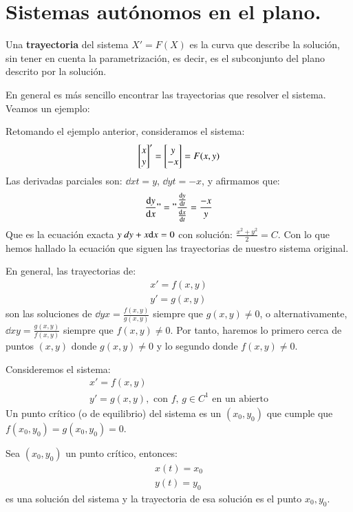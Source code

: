 \section{Sistemas aut\'onomos en el plano.}
\begin{dfn}
    Una \textbf{trayectoria} del sistema $X' = F(X)$ es la curva que describe la solución, sin tener en cuenta la parametrización, es decir, es el subconjunto del plano descrito por la solución.
\end{dfn}
En general es más sencillo encontrar las trayectorias que resolver el sistema. Veamos un ejemplo:
\begin{eg}
    Retomando el ejemplo anterior, consideramos el sistema:
    $$
        \mx{x\\y}' = \mx{y\\-x} = F(x, y)
    $$
    Las derivadas parciales son: $\dd{x}{t} = y$, $\dd{y}{t} = -x$, y afirmamos que:
    $$
        \frac{\mathrm{d}y}{\mathrm{d}x} "=" \frac{\frac{\mathrm{d}y}{\mathrm{d}t}}{\frac{\mathrm{d}x}{\mathrm{d}t}} = \frac{-x}{y}
    $$
    Que es la ecuación exacta $y \ dy + x\mathrm{d} x = 0$ con solución: $\frac{x^2+y^2}{2}=C$. Con lo que hemos hallado la ecuación que siguen las trayectorias de nuestro sistema original.
\end{eg}
En general, las trayectorias de:
\begin{gather*}
    x' = f(x, y)\\
    y' = g(x, y)
\end{gather*}
son las soluciones de $\dd{y}{x} = \frac{f(x, y)}{g(x, y)}$ siempre que $g(x, y) \neq 0$, o alternativamente, $\dd{x}{y} = \frac{g(x, y)}{f(x, y)}$ siempre que $f(x, y) \neq 0$. Por tanto, haremos lo primero cerca de puntos $(x, y)$ donde $g(x, y) \neq 0$ y lo segundo donde $f(x, y) \neq 0$.
\begin{dfn}
    Consideremos el sistema:
    \begin{gather*}
        x' = f(x, y)\\
        y' = g(x, y),\text{ con $f$, $g \in C^1$ en un abierto}
    \end{gather*}
    Un punto crítico (o de equilibrio) del sistema es un $(x_0, y_0)$ que cumple que $f(x_0, y_0) = g(x_0, y_0) = 0$.
\end{dfn}
\begin{obs}
    Sea $(x_0, y_0)$ un punto crítico, entonces:
    \begin{gather*}
        x(t) = x_0\\
        y(t) = y_0
    \end{gather*}
    es una solución del sistema y la trayectoria de  esa solución es el punto $x_0, y_0$.
\end{obs}
